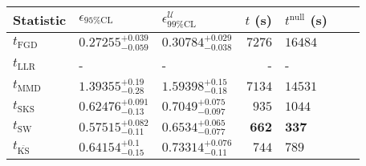 \begin{tabular}{l|llr|llr}
	Statistic & $\epsilon_{95\%\mathrm{CL}}$ & $\epsilon^    {\mathcal{U}}_{99\%\mathrm{CL}}$ & $t$ (s) & $t^{\mathrm{null}}$ (s) \\
	\midrule
	$t_{\mathrm{FGD}}$ & ${\mathbf{0.27255_{-0.059}^{+0.039}}}$ & ${\mathbf{0.30784_{-0.038}^{+0.029}}}$ & $7276$ & $16484$ \\
	$t_{\mathrm{LLR}}$ & - & - & - & - \\
	$t_{\mathrm{MMD}}$ & $1.39355_{-0.28}^{+0.19}$ & $1.59398_{-0.18}^{+0.15}$ & $7134$ & $14531$ \\
	$t_{\mathrm{SKS}}$ & $0.62476_{-0.13}^{+0.091}$ & $0.7049_{-0.097}^{+0.075}$ & $935$ & $1044$ \\
	$t_{\mathrm{SW}}$ & $0.57515_{-0.11}^{+0.082}$ & $0.6534_{-0.077}^{+0.065}$ & ${\mathbf{662}}$ & ${\mathbf{337}}$ \\
	$t_{\overline{\mathrm{KS}}}$ & $0.64154_{-0.15}^{+0.1}$ & $0.73314_{-0.11}^{+0.076}$ & $744$ & $789$ \\
	\bottomrule
\end{tabular}